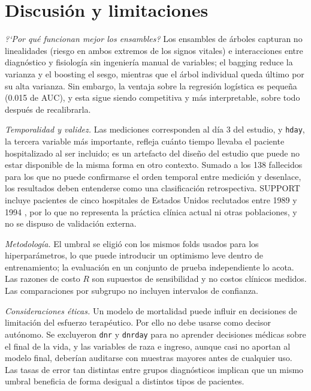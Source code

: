 \documentclass[conference]{IEEEtran}
\begin{document}
\section{Discusión y limitaciones}
\textit{?`Por qué funcionan mejor los ensambles?} Los ensambles de árboles capturan no linealidades (riesgo en ambos extremos de los signos vitales) e interacciones entre diagnóstico y fisiología sin ingeniería manual de variables; el bagging reduce la varianza y el boosting el sesgo, mientras que el árbol individual queda último por su alta varianza. Sin embargo, la ventaja sobre la regresión logística es pequeña (0.015 de AUC), y esta sigue siendo competitiva y más interpretable, sobre todo después de recalibrarla.

\textit{Temporalidad y validez.} Las mediciones corresponden al día 3 del estudio, y \texttt{hday}, la tercera variable más importante, refleja cuánto tiempo llevaba el paciente hospitalizado al ser incluido; es un artefacto del diseño del estudio que puede no estar disponible de la misma forma en otro contexto. Sumado a los 138 fallecidos para los que no puede confirmarse el orden temporal entre medición y desenlace, los resultados deben entenderse como una clasificación retrospectiva. SUPPORT incluye pacientes de cinco hospitales de Estados Unidos reclutados entre 1989 y 1994 \cite{knaus1995}, por lo que no representa la práctica clínica actual ni otras poblaciones, y no se dispuso de validación externa.

\textit{Metodología.} El umbral se eligió con los mismos folds usados para los hiperparámetros, lo que puede introducir un optimismo leve dentro de entrenamiento; la evaluación en un conjunto de prueba independiente lo acota. Las razones de costo $R$ son supuestos de sensibilidad y no costos clínicos medidos. Las comparaciones por subgrupo no incluyen intervalos de confianza.

\textit{Consideraciones éticas.} Un modelo de mortalidad puede influir en decisiones de limitación del esfuerzo terapéutico. Por ello no debe usarse como decisor autónomo. Se excluyeron \texttt{dnr} y \texttt{dnrday} para no aprender decisiones médicas sobre el final de la vida, y las variables de raza e ingreso, aunque casi no aportan al modelo final, deberían auditarse con muestras mayores antes de cualquier uso. Las tasas de error tan distintas entre grupos diagnósticos implican que un mismo umbral beneficia de forma desigual a distintos tipos de pacientes.
\end{document}
